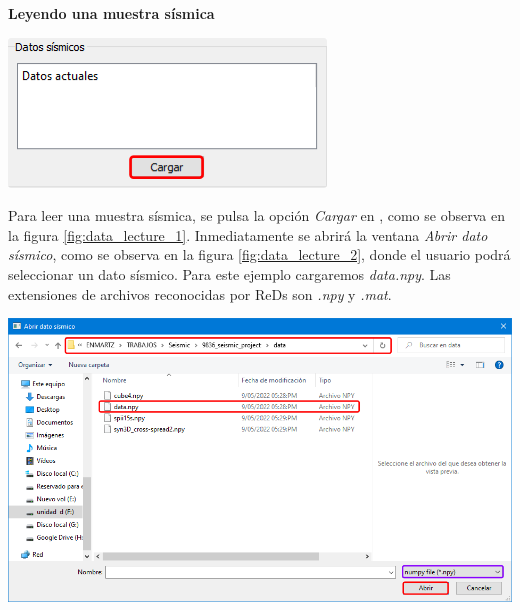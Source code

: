 \documentclass[12pt,oneside,letter]{ol-softwaremanual}
\newcommand*\circled[1]{\tikz[baseline=(char.base)]{
            \node[shape=circle,draw,inner sep=2pt] (char) {#1};}}
\newenvironment{Figure}
  {\par\medskip\noindent\minipage{\linewidth}}
  {\endminipage\par\medskip}
\begin{document}
\textbf{Leyendo una muestra sísmica} \label{sec:data_lecture}

\begin{multicols}{2}
	
\begin{Figure}
	\centering
	\includegraphics[width=.9\linewidth]{data-lecture-1.png}
	\label{fig:data_lecture_1}
\end{Figure}

Para leer una muestra sísmica, se pulsa la opción \emph{Cargar} en \circled{2}, como se observa en la figura \ref{fig:data_lecture_1}. Inmediatamente se abrirá la ventana \textit{Abrir dato sísmico}, como se observa en la figura \ref{fig:data_lecture_2}, donde el usuario podrá seleccionar un dato sísmico. Para este ejemplo cargaremos \emph{data.npy}. Las extensiones de archivos reconocidas por ReDs son \emph{.npy} y \emph{.mat}.

\end{multicols}

\begin{Figure}
    \centering
    \includegraphics[width=1\linewidth]{data-lecture-2.png}
    \label{fig:data_lecture_2}
\end{Figure}
\end{document}
